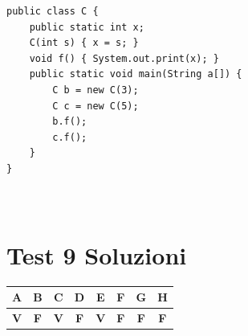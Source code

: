 \documentclass[a4paper,12pt]{article}
\begin{document}
\begin{lstlisting}[style=java]
public class C {
    public static int x;
    C(int s) { x = s; }
    void f() { System.out.print(x); }
    public static void main(String a[]) {
        C b = new C(3);
        C c = new C(5);
        b.f();
        c.f();
    }
}



\end{lstlisting}

\newpage

\section*{Test 9 Soluzioni}

\noindent
\begin{tabular}{|c|c|c|c|c|c|c|c|}
\hline
\rule{0pt}{1.4em}\textbf{A} & \textbf{B} & \textbf{C} & \textbf{D} & \textbf{E} & \textbf{F} & \textbf{G} & \textbf{H} \\[2pt]
\hline
\textbf{V} & \textbf{F} & \textbf{V} & \textbf{F} & \textbf{V} & \textbf{F} & \textbf{F} & \textbf{F} \\[8pt]
\hline
\end{tabular}

\bigskip
\end{document}
